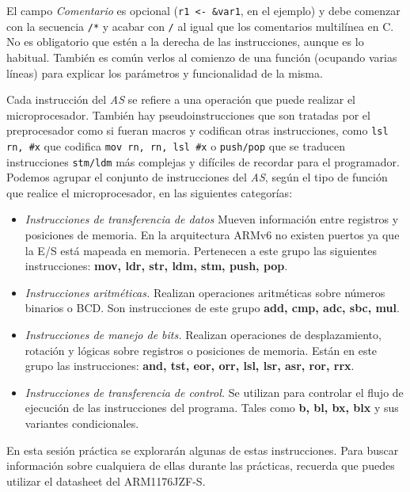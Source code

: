 El campo \textit{Comentario} es opcional ({\tt r1 <- &var1}, en el ejemplo)
y debe comenzar con la secuencia {\tt /*} y acabar con {\tt */} al igual
que los comentarios multilínea en C. No es obligatorio que estén a la
derecha de las instrucciones, aunque es lo habitual. También es común
verlos al comienzo de una función (ocupando varias líneas) para explicar
los parámetros y funcionalidad de la misma.

Cada instrucción del {\it AS} se refiere a una operación que puede
realizar el microprocesador. También hay pseudoinstrucciones que son
tratadas por el preprocesador como si fueran macros y codifican otras
instrucciones, como {\tt lsl rn, #x} que codifica {\tt mov rn, rn, lsl #x}
o {\tt push/pop} que se traducen instrucciones {\tt stm/ldm} más complejas
y difíciles de recordar para el programador. Podemos agrupar el conjunto de
instrucciones del {\it AS}, según el tipo de función que realice el
microprocesador, en las siguientes categorías:

\begin{itemize}

       \item \textit{Instrucciones de transferencia de datos}
Mueven información entre registros y posiciones de memoria. En la
arquitectura ARMv6 no existen puertos ya que la E/S está mapeada
en memoria. Pertenecen a este grupo las siguientes instrucciones:
\textbf{mov, ldr, str, ldm, stm, push, pop}.

       \item \textit{Instrucciones aritméticas.}  Realizan operaciones
aritméticas sobre números binarios o BCD.  Son instrucciones de este
grupo \textbf{add, cmp, adc, sbc, mul}.

     \item \textit{Instrucciones de manejo de bits.}  Realizan
operaciones de desplazamiento, rotación y lógicas sobre registros o
posiciones de memoria. Están en este grupo las instrucciones:\textbf{
and, tst, eor, orr, lsl, lsr, asr, ror, rrx}.

     \item \textit{Instrucciones de transferencia de control.}  Se
utilizan para controlar el flujo de ejecución de las instrucciones
del programa. Tales como \textbf{b, bl, bx, blx} y sus variantes
condicionales.

\end{itemize}

En esta sesión práctica se explorarán algunas de estas instrucciones.
Para buscar información sobre cualquiera de ellas durante las prácticas,
recuerda que puedes utilizar el datasheet del ARM1176JZF-S.

\chapterend{}

